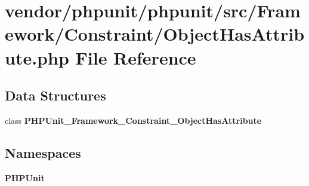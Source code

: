 \section{vendor/phpunit/phpunit/src/\+Framework/\+Constraint/\+Object\+Has\+Attribute.php File Reference}
\label{_object_has_attribute_8php}
\subsection*{Data Structures}
\begin{DoxyCompactItemize}
\item 
class {\bf P\+H\+P\+Unit\+\_\+\+Framework\+\_\+\+Constraint\+\_\+\+Object\+Has\+Attribute}
\end{DoxyCompactItemize}
\subsection*{Namespaces}
\begin{DoxyCompactItemize}
\item 
 {\bf P\+H\+P\+Unit}
\end{DoxyCompactItemize}
